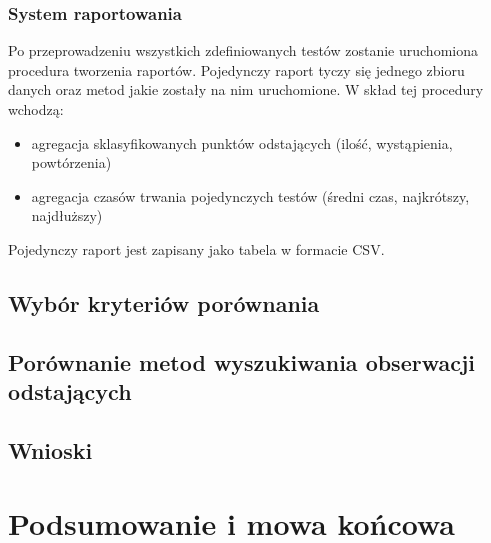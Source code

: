 \documentclass[eng,printmode]{mgr}
\begin{document}
\subsection{System raportowania}
Po przeprowadzeniu wszystkich zdefiniowanych testów zostanie uruchomiona procedura tworzenia raportów. Pojedynczy raport tyczy się jednego zbioru danych oraz metod jakie zostały na nim uruchomione. W skład tej procedury wchodzą:
\begin{itemize}
	\item agregacja sklasyfikowanych punktów odstających (ilość, wystąpienia, powtórzenia)
	\item agregacja czasów trwania pojedynczych testów (średni czas, najkrótszy, najdłuższy)
\end{itemize}
Pojedynczy raport jest zapisany jako tabela w formacie CSV.
\section{Wybór kryteriów porównania}
\section{Porównanie metod wyszukiwania obserwacji odstających}
\section{Wnioski}
\chapter{Podsumowanie i mowa końcowa}



\end{document}
